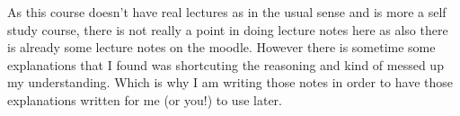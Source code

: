 \documentclass[a4paper]{book}
\begin{document}
As this course doesn't have real lectures as in the usual sense and is more a self study course, there is not really a point in doing lecture notes here as also there is already some lecture notes on the moodle. However there is sometime some explanations that I found was shortcuting the reasoning and kind of messed up my understanding. Which is why I am writing those notes in order to have those explanations written for me (or you!) to use later.
\newpage


\tableofcontents
\newpage



\end{document}
